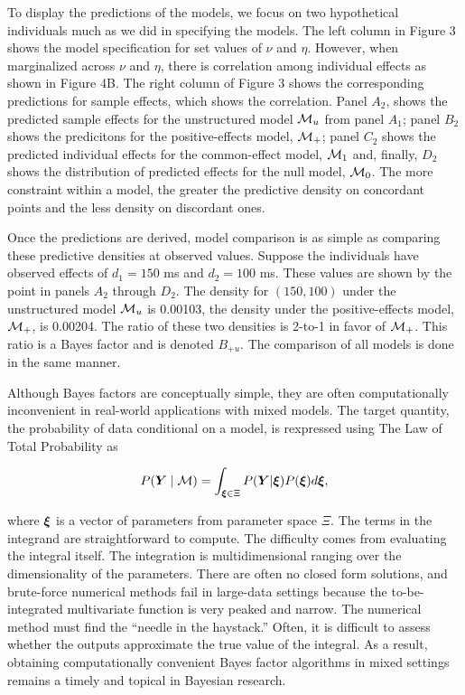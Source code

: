 \documentclass[american,man]{apa6}
\begin{document}
To display the predictions of the models, we focus on two hypothetical
individuals much as we did in specifying the models. The left column in
Figure 3 shows the model specification for set values of \(\nu\) and
\(\eta\). However, when marginalized across \(\nu\) and \(\eta\), there
is correlation among individual effects as shown in Figure 4B. The right
column of Figure 3 shows the corresponding predictions for sample
effects, which shows the correlation. Panel \(A_2\), shows the predicted
sample effects for the unstructured model \({\cal M}_u\) from panel
\(A_1\); panel \(B_2\) shows the predicitons for the positive-effects
model, \({\cal M}_+\); panel \(C_2\) shows the predicted individual effects
for the common-effect model, \({\cal M}_1\) and, finally, \(D_2\) shows the
distribution of predicted effects for the null model, \({\cal M}_0\). The
more constraint within a model, the greater the predictive density on
concordant points and the less density on discordant ones.

Once the predictions are derived, model comparison is as simple as
comparing these predictive densities at observed values. Suppose the
individuals have observed effects of \(d_1 = 150\) ms and \(d_2 = 100\)
ms. These values are shown by the point in panels \(A_2\) through
\(D_2\). The density for \((150, 100)\) under the unstructured model
\({\cal M}_u\) is 0.00103, the density under the positive-effects model,
\({\cal M}_+\), is 0.00204. The ratio of these two densities is 2-to-1 in
favor of \({\cal M}_+\). This ratio is a Bayes factor and is denoted
\(B_{+u}\). The comparison of all models is done in the same manner.

Although Bayes factors are conceptually simple, they are often
computationally inconvenient in real-world applications with mixed
models. The target quantity, the probability of data conditional on a
model, is rexpressed using The Law of Total Probability as

\begin{equation} \label{bfInt}
P(\bm Y \mid {\cal M}) = \int_{\bm \xi \in \Xi} P(\bm Y|\bm \xi)P(\bm \xi)d\bm \xi,
\end{equation}

where \(\bm \xi\) is a vector of parameters from parameter space \(\Xi\).
The terms in the integrand are straightforward to compute. The
difficulty comes from evaluating the integral itself. The integration is
multidimensional ranging over the dimensionality of the parameters.
There are often no closed form solutions, and brute-force numerical
methods fail in large-data settings because the to-be-integrated
multivariate function is very peaked and narrow. The numerical method
must find the \enquote{needle in the haystack.} Often, it is difficult
to assess whether the outputs approximate the true value of the
integral. As a result, obtaining computationally convenient Bayes factor
algorithms in mixed settings remains a timely and topical in Bayesian
research.
\end{document}
